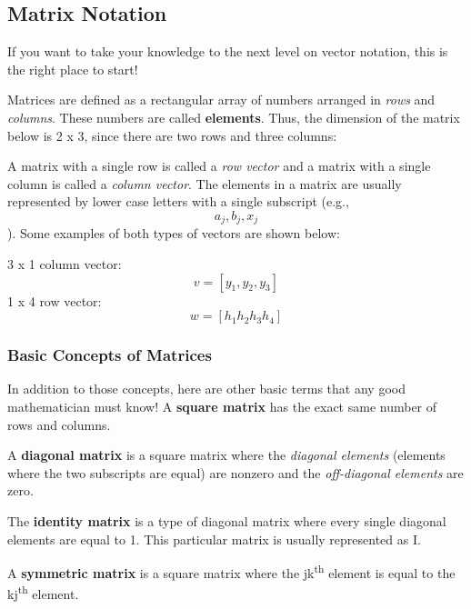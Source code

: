 \subsection{Matrix Notation}
If you want to take your knowledge to the next level on vector notation, this is the right place to start! 

Matrices are defined as a rectangular array of numbers arranged in \textit{rows} and \textit{columns}. These numbers are called \textbf{elements}. Thus, the dimension of the matrix below is 2 x 3, since there are two rows and three columns:

{
\begin{center}
\end{center}
}

A matrix with a single row is called a \textit{row vector} and a matrix with a single column is called a \textit{column vector}. The elements in a matrix are usually represented by lower case letters with a single subscript (e.g., \[a_j, b_j, x_j\]). Some examples of both types of vectors are shown below:

3 x 1 column vector: \[v = [y_1, y_2, y_3]\]
1 x 4 row vector: \[w = [h_1 h_2 h_3 h_4]\]
\subsubsection{Basic Concepts of Matrices}
In addition to those concepts, here are other basic terms that any good mathematician must know! 
A \textbf{square matrix} has the exact same number of rows and columns. 

A \textbf{diagonal matrix} is a square matrix where the \textit{diagonal elements} (elements where the two subscripts are equal) are nonzero and the \textit{off-diagonal elements} are zero.

The \textbf{identity matrix} is a type of diagonal matrix where every single diagonal elements are equal to 1. This particular matrix is usually represented as I. 

A \textbf{symmetric matrix} is a square matrix where the jk\textsuperscript{th} element is equal to the kj\textsuperscript{th} element.

